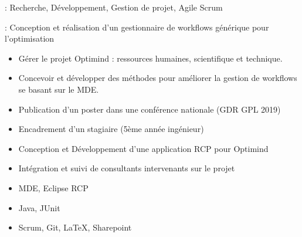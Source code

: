 

 : Recherche, Développement, Gestion de projet, Agile Scrum 

 : Conception et réalisation d'un gestionnaire de workflows générique pour l'optimisation

\bigskip


\begin{itemize}
\item Gérer le projet Optimind : ressources humaines, scientifique et technique.
\item Concevoir et développer des méthodes pour améliorer la gestion de workflows se basant sur le MDE.
\end{itemize} 


\begin{itemize}
\item Publication d'un poster dans une conférence nationale (GDR GPL 2019)
\item Encadrement d'un stagiaire (5ème année ingénieur)
\item Conception et Développement d'une application RCP pour Optimind
\item Intégration et suivi de consultants intervenants sur le projet
\end{itemize} 


\begin{itemize}
\item MDE, Eclipse RCP
\item Java, JUnit
\item Scrum, Git, LaTeX, Sharepoint
\end{itemize}